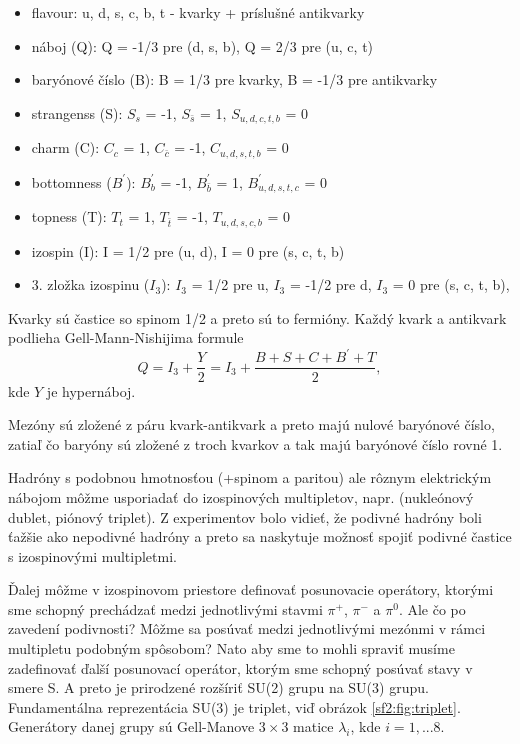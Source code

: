 \documentclass[../../main.tex]{subfiles}
\begin{document}
\begin{itemize}
\item flavour: u, d, s, c, b, t - kvarky + príslušné antikvarky
\item náboj (Q): Q = -1/3 pre (d, s, b), Q = 2/3 pre (u, c, t)
\item baryónové číslo (B): B = 1/3 pre kvarky, B = -1/3 pre antikvarky
\item strangenss (S): $S_s$ = -1, $S_{\bar{s}}$ = 1, $S_{u,d,c,t,b}$ = 0
\item charm (C): $C_c$ = 1, $C_{\bar{c}}$ = -1, $C_{u,d,s,t,b}$ = 0
\item bottomness ($B^{\prime}$): $B^{\prime}_b$ = -1, $B^{\prime}_{\bar{b}}$ = 1, $B^{\prime}_{u,d,s,t,c}$ = 0
\item topness (T): $T_t$ = 1, $T_{\bar{t}}$ = -1, $T_{u,d,s,c,b}$ = 0
\item izospin (I): I = 1/2 pre (u, d), I = 0 pre (s, c, t, b)
\item 3. zložka izospinu ($I_3$): $I_3$ = 1/2 pre u, $I_3$ = -1/2 pre d, $I_3$ = 0 pre (s, c, t, b),
\end{itemize}
Kvarky sú častice so spinom 1/2 a preto sú to fermióny. Každý kvark a antikvark podlieha Gell-Mann-Nishijima formule
\begin{equation}
Q=I_3+\frac{Y}{2}=I_3+\frac{B+S+C+B^{\prime}+T}{2},
\end{equation}
kde $Y$ je hypernáboj.

Mezóny sú zložené z páru kvark-antikvark a preto majú nulové baryónové číslo, zatiaľ čo baryóny sú zložené z troch kvarkov a tak majú baryónové číslo rovné 1.

Hadróny s podobnou hmotnosťou (+spinom a paritou) ale rôznym elektrickým nábojom môžme usporiadať do izospinových multipletov, napr. (nukleónový dublet, piónový triplet). Z experimentov bolo vidieť, že podivné hadróny boli ťažšie ako nepodivné hadróny a preto sa naskytuje možnosť spojiť podivné častice s izospinovými multipletmi. 

Ďalej môžme v izospinovom priestore definovať posunovacie operátory, ktorými sme schopný prechádzať medzi jednotlivými stavmi $\pi^{+}$, $\pi^{-}$ a $\pi^{0}$. Ale čo po zavedení podivnosti? Môžme sa posúvať medzi jednotlivými mezónmi v rámci multipletu podobným spôsobom? Nato aby sme to mohli spraviť musíme zadefinovať ďalší posunovací operátor, ktorým sme schopný posúvať stavy v smere S. A preto je prirodzené rozšíriť SU(2) grupu na SU(3) grupu. Fundamentálna reprezentácia SU(3) je triplet, viď obrázok \ref{sf2:fig:triplet}. Generátory danej grupy sú Gell-Manove $3 \times 3$ matice $\lambda_i$, kde $i=1,... 8$. 
\end{document}
